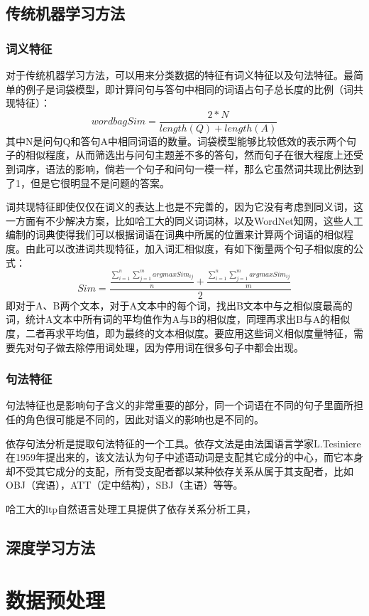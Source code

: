 \documentclass[UTF8]{ctexart}
\begin{document}
\subsection{传统机器学习方法}
\subsubsection{词义特征}
对于传统机器学习方法，可以用来分类数据的特征有词义特征以及句法特征。最简单的例子是词袋模型，即计算问句与答句中相同的词语占句子总长度的比例（词共现特征）：$$wordbagSim=\frac{2*N}{length(Q)+length(A)}$$其中N是问句Q和答句A中相同词语的数量。词袋模型能够比较低效的表示两个句子的相似程度，从而筛选出与问句主题差不多的答句，然而句子在很大程度上还受到词序，语法的影响，倘若一个句子和问句一模一样，那么它虽然词共现比例达到了1，但是它很明显不是问题的答案。

词共现特征即使仅仅在词义的表达上也是不完善的，因为它没有考虑到同义词，这一方面有不少解决方案，比如哈工大的同义词词林，以及WordNet知网，这些人工编制的词典使得我们可以根据词语在词典中所属的位置来计算两个词语的相似程度。由此可以改进词共现特征，加入词汇相似度，有如下衡量两个句子相似度的公式：$$Sim =\frac{\frac{\sum^n_{i=1}\sum_{j=1}^m argmax Sim_{ij}}{n}+\frac{\sum^n_{i=1}\sum_{j=1}^m argmax Sim_{ij}}{m}}{2}$$
即对于A、B两个文本，对于A文本中的每个词，找出B文本中与之相似度最高的词，统计A文本中所有词的平均值作为A与B的相似度，同理再求出B与A的相似度，二者再求平均值，即为最终的文本相似度。要应用这些词义相似度量特征，需要先对句子做去除停用词处理，因为停用词在很多句子中都会出现。%

\subsubsection{句法特征}
句法特征也是影响句子含义的非常重要的部分，同一个词语在不同的句子里面所担任的角色很可能是不同的，因此对语义的影响也是不同的。

依存句法分析是提取句法特征的一个工具。依存文法是由法国语言学家L.Tesiniere在1959年提出来的，该文法认为句子中述语动词是支配其它成分的中心，而它本身却不受其它成分的支配，所有受支配者都以某种依存关系从属于其支配者，比如OBJ（宾语），ATT（定中结构），SBJ（主语）等等。

哈工大的ltp自然语言处理工具提供了依存关系分析工具，
\subsection{深度学习方法}

\section{数据预处理}
\end{document}
